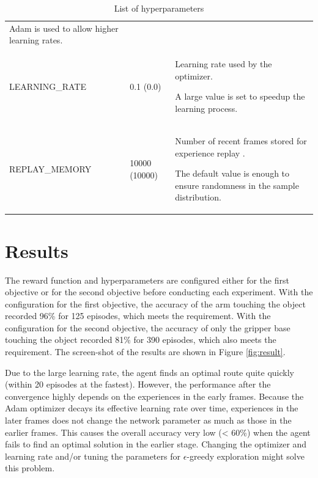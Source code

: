 \documentclass[a4paper]{article}
\begin{document}
\begin{table}[htp]
\begin{tabular}{p{3.5cm}|p{1.5cm}|p{8.5cm}}
Adam \cite{DBLP:journals/corr/KingmaB14} is used to allow higher learning rates. \\
LEARNING\_RATE & 0.1 (0.0) & Learning rate used by the optimizer.

A large value is set to speedup the learning process. \\
REPLAY\_MEMORY & 10000 (10000) & Number of recent frames stored for experience replay \cite{Zhan2016}.

The default value is enough to ensure randomness in the sample distribution. \\
\end{tabular}
\caption{List of hyperparameters}
\label{tab:hyperparameters}
\end{table}

\section{Results}
The reward function and hyperparameters are configured either for the first objective or for the second objective before conducting each experiment. With the configuration for the first objective, the accuracy of the arm touching the object recorded 96\% for 125 episodes, which meets the requirement. With the configuration for the second objective, the accuracy of only the gripper base touching the object recorded 81\% for 390 episodes, which also meets the requirement. The screen-shot of the results are shown in Figure \ref{fig:result}.

Due to the large learning rate, the agent finds an optimal route quite quickly (within 20 episodes at the fastest). However, the performance after the convergence highly depends on the experiences in the early frames. Because the Adam optimizer decays its effective learning rate over time, experiences in the later frames does not change the network parameter as much as those in the earlier frames. This causes the overall accuracy very low (< 60\%) when the agent fails to find an optimal solution in the earlier stage. Changing the optimizer and learning rate and/or tuning the parameters for \(\epsilon\)-greedy exploration might solve this problem.
\end{document}
